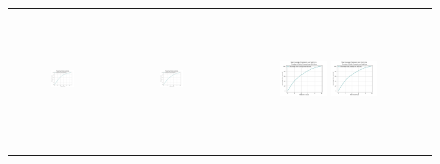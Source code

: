 \begin{figure}[p]
\begin{tabular}{ccc}
        \includegraphics[height=36mm,width=0.24\textwidth]{Images/simulation_no_obs/coverage_plots/41.png}
        & \includegraphics[height=36mm,width=0.24\textwidth]{Images/simulation_no_obs/coverage_plots/42.png}
        & \includegraphics[height=36mm,width=0.24\textwidth]{Images/simulation_no_obs/coverage_plots/43.png}
        \includegraphics[height=36mm,width=0.24\textwidth]{Images/simulation_no_obs/coverage_plots/44.png}\\[-4pt]


\end{tabular}
\end{figure}
